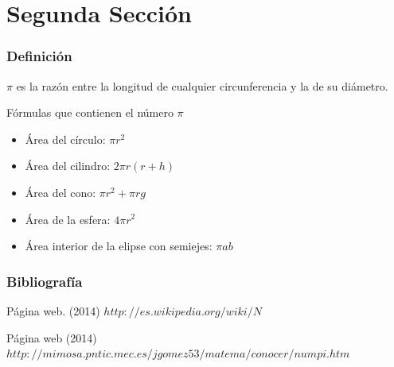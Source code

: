 \documentclass{beamer}
\begin{document}
\section{Segunda Sección}
  
\begin{frame}
\frametitle{Definición}
$\pi$ es la razón entre la longitud de cualquier circunferencia y la de su diámetro.
\begin{block}{Fórmulas que contienen el número $\pi$}
  \begin{itemize}
  \item
   Área del círculo: $\pi r^2$
  \pause

  \item
   Área del cilindro: $2\pi r(r+h)$
  \pause

  \item
   Área del cono: $\pi r^2 +\pi rg$
  \pause

  \item
   Área de la esfera: $4\pi r^2$
  \pause

  \item
   Área interior de la elipse con semiejes: $\pi ab$
  \pause

  \end{itemize}
\end{block}

\end{frame}

\begin{frame}
  \frametitle{Bibliografía}

  \begin{thebibliography}{10}
    \beamertemplatebookbibitems
    Página web. 
    (2014) 
   {\small $http://es.wikipedia.org/wiki/N$}

    \beamertemplatebookbibitems
    Página web
    (2014) 
   {\small $http://mimosa.pntic.mec.es/jgomez53/matema/conocer/numpi.htm$}

   \end{thebibliography}
\end{frame}
\end{document}
